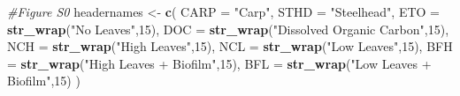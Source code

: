 \documentclass[
]{article}
\newenvironment{Shaded}{\begin{snugshade}}{\end{snugshade}}
\newcommand{\AttributeTok}[1]{\textcolor[rgb]{0.13,0.29,0.53}{#1}}
\newcommand{\CommentTok}[1]{\textcolor[rgb]{0.56,0.35,0.01}{\textit{#1}}}
\newcommand{\DecValTok}[1]{\textcolor[rgb]{0.00,0.00,0.81}{#1}}
\newcommand{\FunctionTok}[1]{\textcolor[rgb]{0.13,0.29,0.53}{\textbf{#1}}}
\newcommand{\NormalTok}[1]{#1}
\newcommand{\OtherTok}[1]{\textcolor[rgb]{0.56,0.35,0.01}{#1}}
\newcommand{\StringTok}[1]{\textcolor[rgb]{0.31,0.60,0.02}{#1}}
\begin{document}
\begin{Shaded}
\begin{Highlighting}[]
\CommentTok{\#Figure S0}
\NormalTok{headernames }\OtherTok{\textless{}{-}} \FunctionTok{c}\NormalTok{(}
  \StringTok{\textasciigrave{}}\AttributeTok{CARP}\StringTok{\textasciigrave{}} \OtherTok{=} \StringTok{"Carp"}\NormalTok{,}
  \StringTok{\textasciigrave{}}\AttributeTok{STHD}\StringTok{\textasciigrave{}} \OtherTok{=} \StringTok{"Steelhead"}\NormalTok{,}
  \StringTok{\textasciigrave{}}\AttributeTok{ETO}\StringTok{\textasciigrave{}} \OtherTok{=} \FunctionTok{str\_wrap}\NormalTok{(}\StringTok{"No Leaves"}\NormalTok{,}\DecValTok{15}\NormalTok{),}
  \StringTok{\textasciigrave{}}\AttributeTok{DOC}\StringTok{\textasciigrave{}} \OtherTok{=} \FunctionTok{str\_wrap}\NormalTok{(}\StringTok{"Dissolved Organic Carbon"}\NormalTok{,}\DecValTok{15}\NormalTok{),}
  \StringTok{\textasciigrave{}}\AttributeTok{NCH}\StringTok{\textasciigrave{}} \OtherTok{=} \FunctionTok{str\_wrap}\NormalTok{(}\StringTok{"High Leaves"}\NormalTok{,}\DecValTok{15}\NormalTok{),}
  \StringTok{\textasciigrave{}}\AttributeTok{NCL}\StringTok{\textasciigrave{}} \OtherTok{=} \FunctionTok{str\_wrap}\NormalTok{(}\StringTok{"Low Leaves"}\NormalTok{,}\DecValTok{15}\NormalTok{),}
  \StringTok{\textasciigrave{}}\AttributeTok{BFH}\StringTok{\textasciigrave{}} \OtherTok{=} \FunctionTok{str\_wrap}\NormalTok{(}\StringTok{"High Leaves + Biofilm"}\NormalTok{,}\DecValTok{15}\NormalTok{),}
  \StringTok{\textasciigrave{}}\AttributeTok{BFL}\StringTok{\textasciigrave{}} \OtherTok{=} \FunctionTok{str\_wrap}\NormalTok{(}\StringTok{"Low Leaves + Biofilm"}\NormalTok{,}\DecValTok{15}\NormalTok{)}
\NormalTok{)}


\end{Highlighting}
\end{Shaded}
\end{document}
